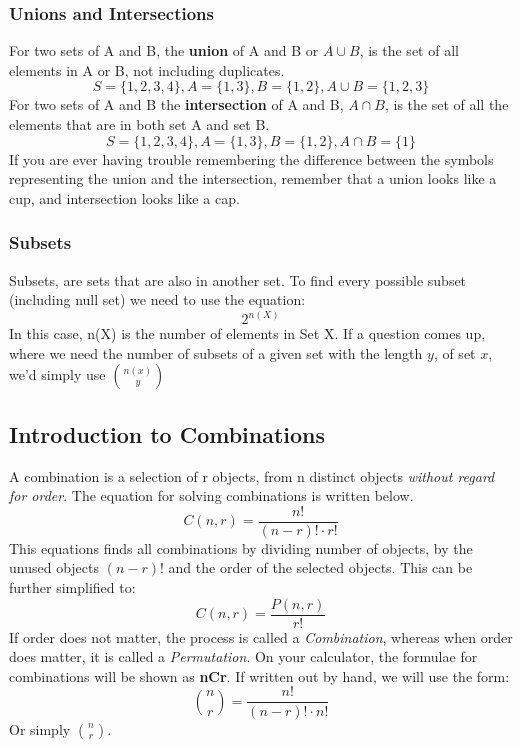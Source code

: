 \documentclass[final,1p,12pt]{elsarticle}
\begin{document}
        \subsubsection{Unions and Intersections}
        For two sets of A and B, the \textbf{union} of A and B or $A\cup B$, is the set of all elements in A or B, not including duplicates.
        \begin{equation}
            S = \{1,2,3,4\}, A = \{1,3\}, B =\{1,2\}, A\cup B=\{1,2,3\}
        \end{equation}
        For two sets of A and B the \textbf{intersection} of A and B, $A\cap B$, is the set of all the elements that are in both set A and set B.
        \begin{equation}
            S = \{1,2,3,4\}, A = \{1,3\}, B =\{1,2\}, A\cap B=\{1\}
        \end{equation}
        If you are ever having trouble remembering the difference between the symbols representing the union and the intersection, remember that a union looks like a cup, and intersection looks like a cap.
        
        \subsubsection{Subsets}
        Subsets, are sets that are also in another set. To find every possible subset (including null set) we need to use the equation:
        \begin{equation}
            2^{n(X)}
        \end{equation}
        In this case, n(X) is the number of elements in Set X. If a question comes up, where we need the number of subsets of a given set with the length $y$, of set $x$, we'd simply use $\binom{n(x)}{y}$
        
    \subsection{Introduction to Combinations}
    A combination is a selection of r objects, from n distinct objects \emph{without regard for order}. The equation for solving combinations is written below.
    \begin{equation}
        C(n,r) = \frac{n!}{(n-r)!\cdot r!}
    \end{equation}
    This equations finds all combinations by dividing number of objects, by the unused objects $(n-r)!$ and the order of the selected objects. This can be further simplified to:
    \begin{equation}
        C(n,r) = \frac{P(n,r)}{r!}
    \end{equation}
    If order does not matter, the process is called a \emph{Combination}, whereas when order does matter, it is called a \emph{Permutation}. On your calculator, the formulae for combinations will be shown as \textbf{nCr}. If written out by hand, we will use the form:
    \begin{equation}
        \binom{n}{r} = \frac{n!}{(n-r)!\cdot n!}
    \end{equation}
    Or simply \(\binom{n}{r}\).
    
\end{document}
